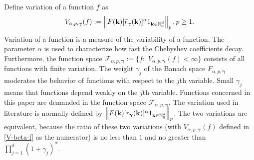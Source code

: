 \documentclass[article]{siamltex}
\def\bk{{\bf k}}
\def\bgam{{\boldsymbol \gamma }}
\def\calF {\mathcal {F}}
\newcommand{\norm}[1]{\left\Vert#1\right\Vert}
\newcommand{\N}{\mathbb{N}}
\begin{document}
Define  variation of a function $f$ as
\begin{equation}\label{V-beta-f}
 V_{\alpha,p,\bgam}(f):=  \norm{F(\bk)[\tilde{r}_\bgam(\bk)]^{\alpha}1_{\bk\in {\N}^d_0}}_p, p\ge 1.
 \end{equation}
Variation of a function is a measure of the variability of a
function. The parameter $\alpha$ is used to characterize how fast
the Chebyshev coefficients decay.
 Furthermore, the function space ${\calF}_{\alpha,p,\bgam}:=\{f:\,\,
  V_{\alpha,p,\bgam}(f)< \infty\}$ consists of all functions with finite variation. The weight $\gamma_j$ of the Banach space $F_{\alpha,p,\bgam}$
moderates the behavior of functions with respect to the $j$th
variable. Small $\gamma_j$ means that functions depend weakly on
the $j$th variable. Functions concerned in this paper are
demanded in the function space ${\calF}_{\alpha,p,\bgam}.$
The variation used in literature is normally defined by $\norm{F(\bk)[{r}_\bgam(\bk)]^{\alpha}1_{\bk\in {\N}^d_0}}_p$. The two variations are equivalent, because the ratio of these two variations (with $V_{\alpha,p,\bgam}(f)$ defined in \eqref{V-beta-f} as the numerator) is no less than $1$ and no greater than $\prod_{j=1}^d(1+\gamma_j)^\alpha$.
\end{document}
